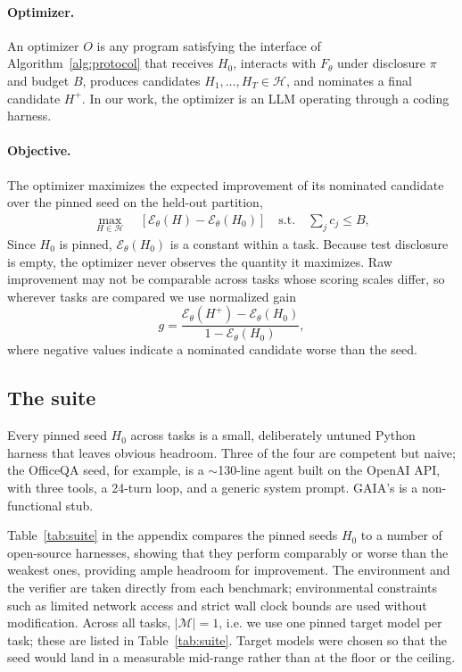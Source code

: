 \paragraph{Optimizer.}
An optimizer $O$ is any program satisfying
the interface of Algorithm~\ref{alg:protocol} that receives $H_0$, interacts with $F_{\theta}$
under disclosure $\pi$ and budget $B$, produces candidates
$H_1,\ldots,H_T\in\mathcal{H}$, and nominates a final candidate $H^{+}$. In our work, the optimizer
is an LLM operating through a coding harness.

\paragraph{Objective.}
The optimizer maximizes the expected improvement of its nominated candidate over
the pinned seed on the held-out partition,
\begin{align*}
\max_{H \in \mathcal{H}}\quad
\![
  \mathcal{E}_{\theta}(H) - \mathcal{E}_{\theta}(H_0)
]
\quad\text{s.t.}\quad
\sum_j c_j\leq B,
\end{align*}
Since $H_0$ is pinned, $\mathcal{E}_{\theta}(H_0)$ is a constant within a task. Because test disclosure is empty, the optimizer never observes
the quantity it maximizes. Raw improvement may not be comparable across
tasks whose scoring scales differ, so wherever tasks are
compared we use normalized gain
\begin{equation}
g
=
\frac{
  \mathcal{E}_{\theta}(H^{+}) - \mathcal{E}_{\theta}(H_0)
}{
  1-\mathcal{E}_{\theta}(H_0)
},
\label{eq:normalized-gain}
\end{equation}
where negative values indicate a nominated candidate worse than the seed.

\subsection{The \heb suite}

\label{sec:suite}
\label{sec:scoring}

Every pinned seed $H_0$ across \heb tasks is a small, deliberately untuned Python
harness that leaves obvious headroom. Three of the four are competent but naive;
the OfficeQA seed, for example, is a $\sim$130-line agent built on the OpenAI API, with three
tools, a 24-turn loop, and a generic system prompt. GAIA's is a non-functional stub.  

Table~\ref{tab:suite} in the appendix compares the pinned seeds $H_0$ to a number of open-source harnesses, showing that they perform comparably or worse than the weakest ones, providing ample headroom for improvement. The environment and the verifier are taken directly from each benchmark; environmental constraints such as limited network access and strict wall clock bounds are used without modification. Across all tasks, $|\mathcal{M}| = 1$, i.e. we use one pinned target model per task; these are listed in Table~\ref{tab:suite}. Target models were chosen so that the seed would land in a measurable
mid-range rather than at the floor or the ceiling. 

